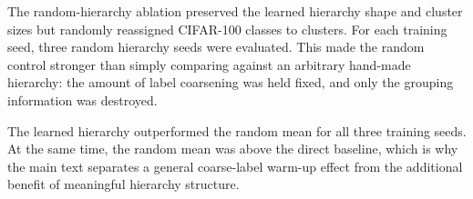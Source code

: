 The random-hierarchy ablation preserved the learned hierarchy shape and cluster
sizes but randomly reassigned CIFAR-100 classes to clusters. For each training
seed, three random hierarchy seeds were evaluated. This made the random control
stronger than simply comparing against an arbitrary hand-made hierarchy: the
amount of label coarsening was held fixed, and only the grouping information was
destroyed.

The learned hierarchy outperformed the random mean for all three training seeds.
At the same time, the random mean was above the direct baseline, which is why the main
text separates a general coarse-label warm-up effect from the additional benefit
of meaningful hierarchy structure.
